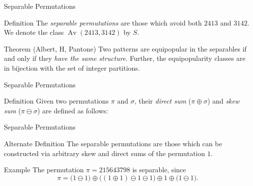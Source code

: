 \documentclass[xcolor=table,dvipsnames]{beamer}
\DeclareMathOperator{\Av}{Av}
\begin{document}
\begin{frame}{Separable Permutations}
  \pause
  \begin{block}{Definition}
    The \emph{separable permutations} are those which avoid both $2413$ and
    $3142$. We denote the class $\Av(2413,3142)$ by $S$. 
  \end{block}
  \pause
  \begin{block}{Theorem (Albert, H, Pantone)}
    Two patterns are equipopular in the separables if and only if they
    \emph{have the same structure}. Further, the equipopularity classes are in 
    bijection with the set of integer partitions.
  \end{block}
\end{frame}


\begin{frame}{Separable Permutations}
  \begin{block}{Definition}
    Given two permutations $\pi$ and $\sigma$, their \emph{direct sum} ($\pi
    \oplus \sigma$) and \emph{skew sum} ($\pi \ominus \sigma$) are defined as
    follows:
  \end{block}
  \begin{center}
    \hspace{2pc}
  \end{center}
\end{frame}


\begin{frame}{Separable Permutations}
  \begin{block}{Alternate Definition}
    The separable permutations are those which can be constructed via arbitrary
    skew and direct sums of the permutation $1$. 
  \end{block}
  \pause
  \begin{block}{Example}
    The permutation $\pi = 215643798$ is separable, since 
    $$ \pi = \Big(1 \ominus 1\Big) \oplus \Big( (1 \oplus 1) \ominus 
       1 \ominus 1 \Big) \oplus 1 \oplus \Big(1 \ominus 1\Big).$$
  \end{block}
\end{frame}
\end{document}

